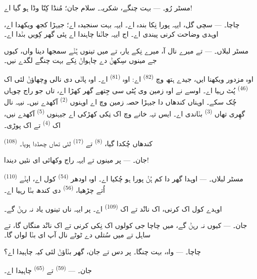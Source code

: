\textsc{مسٹر رُو}۔ --- بہت چنگے، شکریہ۔ سلام جان؛ مُنڈا کِنّا وڈا ہو گیا اے!

\textsc{چاچا}۔ --- سچی گل، ایہہ پورا نِکا بندہ اے۔ ایہہ بہت سنجیدہ اے؛ جیہڑا کجھ
ویکھدا اے، اوہدی وضاحت کرنی پیندی اے۔ اج ایہہ جاݨنا چاہندا اے پئی گھر کِویں
بݨدا اے۔

\VUsaut{3.0mm}

\textsc{مسٹر لبلاں}۔ --- تے میرے نال آ، میرے نِکے یار، تے میں تینوں ہُݨے سمجھا
دینا واں، کیوں جے مینوں سِکھݨ دے چاہواݨ نِکے بہت چنگے لگدے نیں۔

اوہ مزدور ویکھنا ایں، جیدے ہتھ وچ  \textsuperscript{(82)} اے: اوہ
 \textsuperscript{(81)} اے۔ اوہ پاݨی دی نالی وِچھاؤݨ لئی اک
 \textsuperscript{(46)} پُٹ رہیا اے۔ اوسے نے اوہ زمین وی پُٹی سی
جِتھے گھر کھڑا اے، تاں جو راج چوہاں  چُک سکے۔ اوہناں کندھاں دا
جیہڑا حصہ زمین وچ اے اوہنوں  \textsuperscript{(2)} آکھدے نیں۔ نیہہ
نال گھِری تھاں  \textsuperscript{(3)} بݨاندی اے۔ ایس تہہ خانے وچ
اک نِکی کھڑکی اے جیہنوں  \textsuperscript{(5)} آکھدے نیں، اک
 \textsuperscript{(4)} تے اک پوڑی۔

 \textsuperscript{(108)} کندھاں چُکدا گیا، 
\textsuperscript{(8)} تے  \textsuperscript{(17)} لئی تھاں چھڈدا
ہویا۔

\textsc{جان}۔ --- پر مینوں تے ایہہ راج وکھائی ای نئیں دیندا!

\textsc{مسٹر لبلاں}۔ --- اوہدا گھر دا کم ہُݨ پورا ہو چُکیا اے۔ اوہ اودھر
 \textsuperscript{(54)} کول اے، اپݨے  \textsuperscript{(110)}
اُتے چڑھیا،  \textsuperscript{(56)} دی کندھ بݨا رہیا اے۔

اوہدے کول اک کرنی، اک نانْد تے اک  \textsuperscript{(109)} اے۔ پر ایہہ
ناں تینوں یاد نہ رہݨ گے۔

\textsc{جان}۔ --- کیوں نہ رہݨ گے، میں چاچا جی کولوں اک نِکی کرنی تے اک نانْد
منگاں گا، تے ساہل تے میں سُتلی دے ٹوٹے نال آپ ای بݨا لواں گا۔

\VUsaut{3.0mm}
\VUsaut{3.0mm}

\textsc{چاچا}۔ --- واہ، بہت چنگا۔ پر دس تے جان، گھر بݨاؤݨ لئی کیہ چاہیدا اے؟

\textsc{جان}۔ ---  \textsuperscript{(59)} تے
 \textsuperscript{(65)} چاہیدا اے۔

